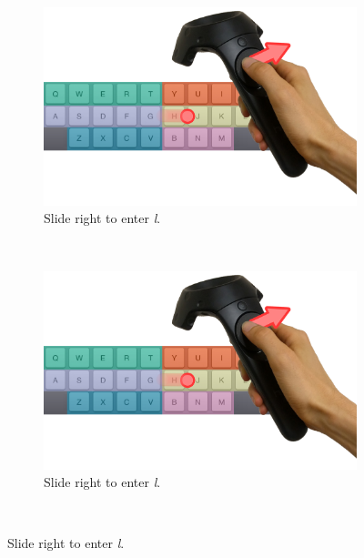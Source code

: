\begin{figure}
  \begin{subfigure}{.6\columnwidth}
  \includegraphics[width=\textwidth]{figures/right}
  \caption{Slide right to enter \textit{l}. }
  \label{fig:controllerVive}
  \end{subfigure}
  \\

  \begin{subfigure}{.6\columnwidth}
  \includegraphics[width=\textwidth]{figures/right}
  \caption{Slide right to enter \textit{l}. }
  \label{fig:controllerVive}
  \end{subfigure}
  \\


\end{figure}
